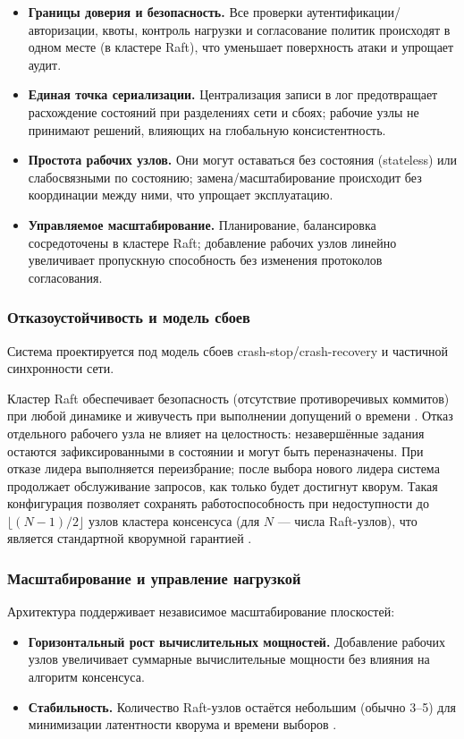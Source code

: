 \begin{itemize}
  \item \textbf{Границы доверия и безопасность.} Все проверки
  аутентификации/авторизации, квоты, контроль нагрузки и согласование политик
  происходят в одном месте (в кластере Raft), что уменьшает поверхность атаки и
  упрощает аудит.
  \item \textbf{Единая точка сериализации.} Централизация записи в лог
  предотвращает расхождение состояний при разделениях сети и сбоях; рабочие узлы не
  принимают решений, влияющих на глобальную консистентность.
  \item \textbf{Простота рабочих узлов.} Они могут оставаться без состояния
  (stateless) или слабосвязными по состоянию; замена/масштабирование происходит
  без координации между ними, что упрощает эксплуатацию.
  \item \textbf{Управляемое масштабирование.} Планирование, балансировка
  сосредоточены в кластере Raft; добавление рабочих узлов линейно увеличивает
  пропускную способность без изменения протоколов согласования.
\end{itemize}

\subsubsection{Отказоустойчивость и модель сбоев}

Система проектируется под модель сбоев crash-stop/crash-recovery и частичной
синхронности сети.

Кластер Raft обеспечивает безопасность (отсутствие противоречивых коммитов) при
любой динамике и живучесть при выполнении допущений о времени
\cite{ongario2014}. Отказ отдельного рабочего узла не влияет на целостность:
незавершённые задания остаются зафиксированными в состоянии и могут быть
переназначены. При отказе лидера выполняется переизбрание; после выбора нового
лидера система продолжает обслуживание запросов, как только будет достигнут
кворум. Такая конфигурация позволяет сохранять работоспособность при
недоступности до $\lfloor (N-1)/2 \rfloor$ узлов кластера консенсуса (для $N$ —
числа Raft-узлов), что является стандартной кворумной гарантией
\cite{lynch1996}.


\subsubsection{Масштабирование и управление нагрузкой}

Архитектура поддерживает независимое масштабирование плоскостей:
\begin{itemize}
  \item \textbf{Горизонтальный рост вычислительных мощностей.} Добавление рабочих узлов
  увеличивает суммарные вычислительные мощности без влияния на алгоритм
  консенсуса.
  \item \textbf{Стабильность.} Количество Raft-узлов остаётся небольшим (обычно
  3–5) для минимизации латентности кворума и времени выборов
  \cite{ongario2014}.
\end{itemize}


